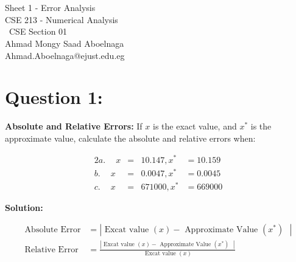 \documentclass[a4paper,12pt]{article}
\begin{document}
\section*{}%
 \pagecolor{background}
	\begin{center}
	\vspace*{6cm}
	\fontsize{40}{60} \selectfont Sheet 1 - Error Analysis \\
	\fontsize{30}{40}\selectfont CSE 213 - Numerical Analysis \\
	\fontsize{28}{35} \qquad \ CSE Section 01\\
	\fontsize{25}{30}\selectfont Ahmad Mongy Saad Aboelnaga\\
	\fontsize{20}{25}\selectfont Ahmad.Aboelnaga@ejust.edu.eg	
	\newpage
	\end{center}
	\addtolength{\topmargin}{-.75in}
\section*{\LARGE Question 1:}

	\textbf{\Large Absolute and Relative Errors:} \Large If \(x\) is the exact value, and \(x^*\) is the approximate
value, calculate the absolute and relative errors when: 

	\begin{alignat*}{2}
 	a.\quad \    x &=& 10.147, x^* &= 10.159\\
 	b. \quad \   x &=& 0.0047, x^* &= 0.0045\\
 	c.  \quad \  x &=& 671000, x^* &= 669000 
	\end{alignat*}

{\color{blue}\textbf{Solution:}}

	\begin{align*}
 	\text{Absolute Error} &= { |\text{ Excat value } (x) - \text{ Approximate Value } (x^*)\text{ }|}\\
  	\text{Relative Error } &=  \frac{ |\text{ Excat value } (x) - \text{ Approximate Value } (x^*)\text{ }|}{\text{ Excat value } (x)}
	\end{align*}
\end{document}
